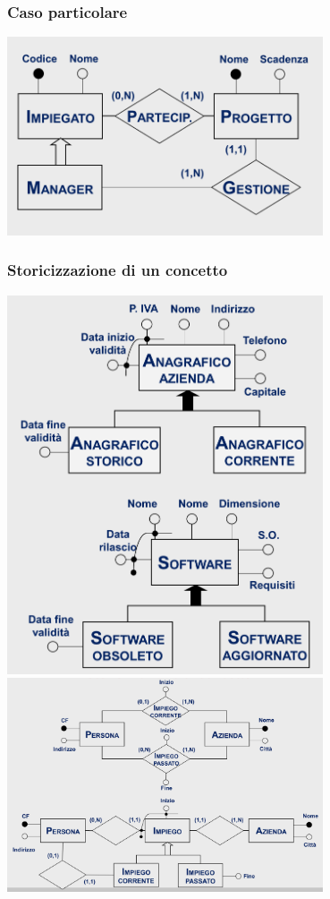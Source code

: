 \subsubsection{Caso particolare}


\begin{center}
    \includegraphics[width=0.7\textwidth]{img/casoParticolare.png}
\end{center}
\subsubsection{Storicizzazione di un concetto}

\begin{center}
    \includegraphics[width=0.7\textwidth]{img/storicizzazioneDiConcetto.png}
    \includegraphics[width=0.7\textwidth]{img/storicizzazioneDiConcetto2.png}
\end{center}

